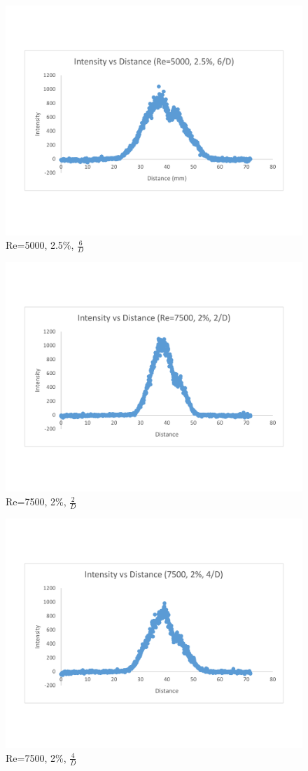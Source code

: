 \documentclass[preview,12pt]{article}
\begin{document}
\begin{figure}[h]
    \centering
    \includegraphics[width=0.55\linewidth]{RE-5000-25-cs6D.pdf}
    \caption{{\footnotesize Re=5000, 2.5\%, $\frac{6}{D}$ }}
\end{figure}
\begin{figure}[h]
    \centering
    \includegraphics[width=0.55\linewidth]{RE-7500-20-cs2D.pdf}
    \caption{{\footnotesize Re=7500, 2\%, $\frac{2}{D}$ }}
\end{figure}
\begin{figure}[h]
    \centering
    \includegraphics[width=0.55\linewidth]{RE-7500-20-cs4D.pdf}
    \caption{{\footnotesize Re=7500, 2\%, $\frac{4}{D}$ }}
\end{figure}
\end{document}
